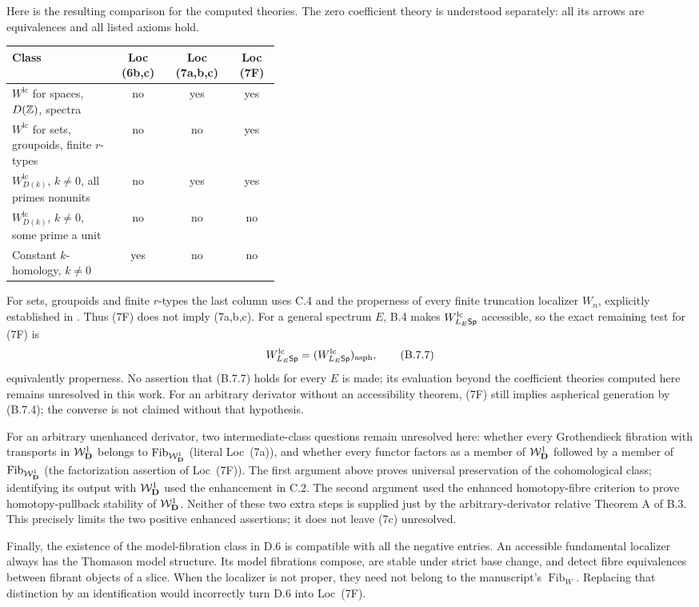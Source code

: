Here is the resulting comparison for the computed theories.
The zero coefficient theory is understood separately: all
its arrows are equivalences and all listed axioms hold.
\begin{center}
\begin{tabular}{p{0.39\linewidth}ccc}
\hline
Class & Loc (6b,c) & Loc (7a,b,c) & Loc (7F)\\
\hline
$W^{\mathrm{lc}}$ for spaces, $D(\mathbb Z)$, spectra
 & no & yes & yes\\
$W^{\mathrm{lc}}$ for sets, groupoids, finite $r$-types
 & no & no & yes\\
$W^{\mathrm{lc}}_{D(k)}$, $k\ne0$, all primes nonunits
 & no & yes & yes\\
$W^{\mathrm{lc}}_{D(k)}$, $k\ne0$, some prime a unit
 & no & no & no\\
Constant $k$-homology, $k\ne0$
 & yes & no & no\\
\hline
\end{tabular}
\end{center}
For sets, groupoids and finite $r$-types the last column
uses C.4 and the properness of every finite truncation
localizer $W_n$, explicitly established in
\citet[\S9.2.1]{Cisinski2006}. Thus (7F) does not imply
(7a,b,c). For a general spectrum $E$, B.4 makes
$W^{\mathrm{lc}}_{L_E\mathsf{Sp}}$ accessible, so the exact
remaining test for (7F) is
\[
 W^{\mathrm{lc}}_{L_E\mathsf{Sp}}
   =(W^{\mathrm{lc}}_{L_E\mathsf{Sp}})_{\mathrm{asph}},
\tag{B.7.7}
\]
equivalently properness. No assertion that (B.7.7)
holds for every $E$ is made; its evaluation beyond
the coefficient theories computed here remains
unresolved in this work. For an arbitrary derivator
without an accessibility theorem, (7F) still implies
aspherical generation by (B.7.4); the converse is
not claimed without that hypothesis.

For an arbitrary unenhanced derivator, two intermediate-class
questions remain unresolved here: whether every Grothendieck
fibration with transports in $\mathcal W_{\mathbf D}^{1}$ belongs to
$\operatorname{Fib}_{\mathcal W_{\mathbf D}^{1}}$ (literal Loc~(7a)), and
whether every functor factors as a member of $\mathcal W_{\mathbf D}^{1}$
followed by a member of $\operatorname{Fib}_{\mathcal W_{\mathbf D}^{1}}$
(the factorization assertion of Loc~(7F)). The first
argument above proves universal preservation of the
cohomological class; identifying its output with
$\mathcal W_{\mathbf D}^{1}$ used the enhancement in C.2. The second
argument used the enhanced homotopy-fibre criterion
to prove homotopy-pullback stability of $\mathcal W_{\mathbf D}^{1}$.
Neither of these two extra steps is supplied just
by the arbitrary-derivator relative Theorem A of B.3.
This precisely limits the two positive enhanced
assertions; it does not leave (7c) unresolved.

Finally, the existence of the model-fibration class
in D.6 is compatible with all the negative entries.
An accessible fundamental localizer always has the
Thomason model structure. Its model fibrations compose,
are stable under strict base change, and detect fibre
equivalences between fibrant objects of a slice.
When the localizer is not proper, they need not belong
to the manuscript's $\operatorname{Fib}_W$.
Replacing that distinction by an identification would
incorrectly turn D.6 into Loc~(7F).
